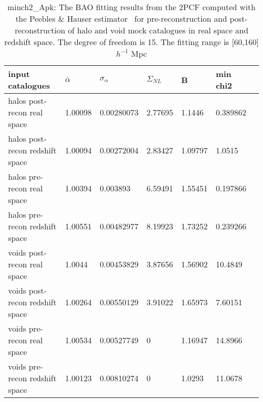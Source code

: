 \begin{table*}
\caption{minch2_Apk: The BAO fitting results from the 2PCF computed with the Peebles \& Hauser estimator~\cite{Peebles1974} for pre-reconstruction and  post-reconstruction of halo and void mock catalogues in real space and redshift space. The degree of freedom is 15. The fitting range is [60,160] $h^{-1}$ Mpc}
\label{tab:LS}
\begin{tabular}{lllllll}
\hline
input catalogues                &$\bar{\alpha}$&$\sigma_{\alpha}$&     $\Sigma_{NL}$ &        B &  min chi2 \\
\hline
halos post-recon real space     & 1.00098 & 0.00280073 & 2.77695 & 1.1446  & 0.389862 \\
halos post-recon redshift space & 1.00094 & 0.00272004 & 2.83427 & 1.09797 & 1.0515   \\
halos pre-recon real space      & 1.00394 & 0.003893   & 6.59491 & 1.55451 & 0.197866 \\
halos pre-recon redshift space  & 1.00551 & 0.00482977 & 8.19923 & 1.73252 & 0.239266 \\ 
\hline
voids post-recon real space     & 1.0044  & 0.00453829 & 3.87656 & 1.56902 & 10.4849  \\
voids post-recon redshift space & 1.00264 & 0.00550129 & 3.91022 & 1.65973 & 7.60151  \\
voids pre-recon real space      & 1.00534 & 0.00527749 & 0       & 1.16947 & 14.8966  \\
voids pre-recon redshift space  & 1.00123 & 0.00810274 & 0       & 1.0293  & 11.0678  \\
\hline
\end{tabular}
\end{table*}

